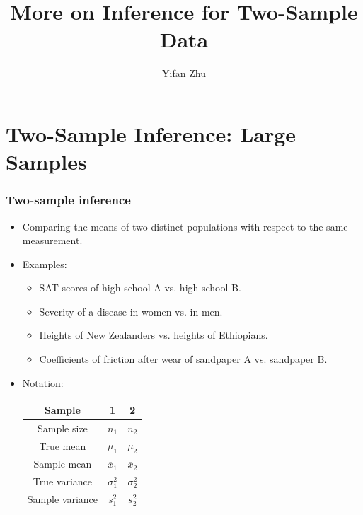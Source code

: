 \documentclass[handout]{beamer}\usepackage[]{graphicx}\usepackage[]{color}
\title{More on Inference for Two-Sample Data}
\author{Yifan Zhu}
\date{}
\institute{Iowa State University}
\providecommand{\ov}[1]{\overline{#1}}
\numberwithin{equation}{section}
\begin{document}
\begin{frame}
\titlepage
 \end{frame}
 



\section{Two-Sample Inference: Large Samples}

\begin{frame}
\frametitle{Two-sample inference}
\begin{itemize}
\item Comparing the means of two distinct populations with respect to the same measurement.
\pause \item Examples:
\begin{itemize}
\item SAT scores of high school A vs. high school B.
\pause \item Severity of a disease in women vs. in men. 
\pause \item Heights of New Zealanders vs. heights of Ethiopians.
\pause \item Coefficients of friction after wear of sandpaper A vs. sandpaper B.
\end{itemize}
\pause \item Notation:
\begin{center}
\begin{tabular}{ccc}
Sample & 1 & 2 \\ \hline
Sample size & $n_1$ & $n_2$ \\ [1ex]
True mean & $\mu_1$ & $\mu_2$ \\ [1ex] 
Sample mean & $\ov{x}_1$ & $\ov{x}_2$ \\ [1ex]
True variance & $\sigma^2_1$ & $\sigma^2_2$ \\ [1ex]
Sample variance & $s^2_1$ & $s^2_2$ 
\end{tabular}
\end{center}

\end{itemize}
\end{frame}
\end{document}
